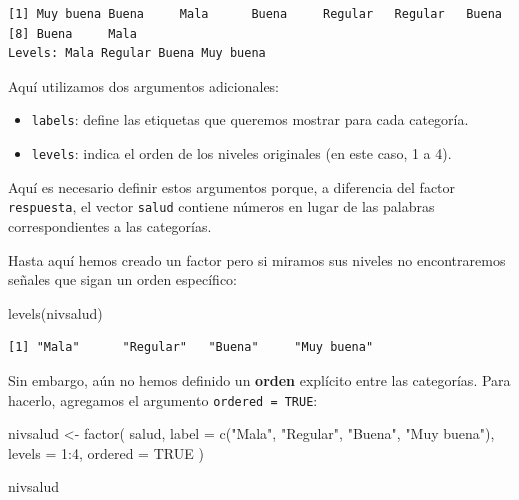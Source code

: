\documentclass[
  spanish,
  a4paper,
]{scrbook}
\newenvironment{Shaded}{\begin{snugshade}}{\end{snugshade}}
\newcommand{\AttributeTok}[1]{\textcolor[rgb]{0.40,0.45,0.13}{#1}}
\newcommand{\ConstantTok}[1]{\textcolor[rgb]{0.56,0.35,0.01}{#1}}
\newcommand{\DecValTok}[1]{\textcolor[rgb]{0.68,0.00,0.00}{#1}}
\newcommand{\FunctionTok}[1]{\textcolor[rgb]{0.28,0.35,0.67}{#1}}
\newcommand{\NormalTok}[1]{\textcolor[rgb]{0.00,0.23,0.31}{#1}}
\newcommand{\OtherTok}[1]{\textcolor[rgb]{0.00,0.23,0.31}{#1}}
\newcommand{\SpecialCharTok}[1]{\textcolor[rgb]{0.37,0.37,0.37}{#1}}
\newcommand{\StringTok}[1]{\textcolor[rgb]{0.13,0.47,0.30}{#1}}
\begin{document}
\begin{verbatim}
[1] Muy buena Buena     Mala      Buena     Regular   Regular   Buena    
[8] Buena     Mala     
Levels: Mala Regular Buena Muy buena
\end{verbatim}

Aquí utilizamos dos argumentos adicionales:

\begin{itemize}
\item
  \texttt{labels}: define las etiquetas que queremos mostrar para cada
  categoría.
\item
  \texttt{levels}: indica el orden de los niveles originales (en este
  caso, 1 a 4).
\end{itemize}

Aquí es necesario definir estos argumentos porque, a diferencia del
factor \texttt{respuesta}, el vector \texttt{salud} contiene números en
lugar de las palabras correspondientes a las categorías.

Hasta aquí hemos creado un factor pero si miramos sus niveles no
encontraremos señales que sigan un orden específico:

\begin{Shaded}
\begin{Highlighting}[]
\FunctionTok{levels}\NormalTok{(nivsalud)}
\end{Highlighting}
\end{Shaded}

\begin{verbatim}
[1] "Mala"      "Regular"   "Buena"     "Muy buena"
\end{verbatim}

Sin embargo, aún no hemos definido un \textbf{orden} explícito entre las
categorías. Para hacerlo, agregamos el argumento
\texttt{ordered\ =\ TRUE}:

\begin{Shaded}
\begin{Highlighting}[]
\NormalTok{nivsalud }\OtherTok{\textless{}{-}} \FunctionTok{factor}\NormalTok{(}
\NormalTok{  salud,}
  \AttributeTok{label =} \FunctionTok{c}\NormalTok{(}\StringTok{"Mala"}\NormalTok{, }\StringTok{"Regular"}\NormalTok{, }\StringTok{"Buena"}\NormalTok{, }\StringTok{"Muy buena"}\NormalTok{),}
  \AttributeTok{levels =} \DecValTok{1}\SpecialCharTok{:}\DecValTok{4}\NormalTok{,}
  \AttributeTok{ordered =} \ConstantTok{TRUE}
\NormalTok{)}

\NormalTok{nivsalud}
\end{Highlighting}
\end{Shaded}
\end{document}
